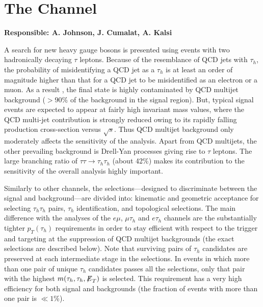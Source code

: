 \section{The \ditauhad Channel}\label{sec:dihad}
\textbf{Responsible: A. Johnson, J. Cumalat, A. Kalsi}


A search for new heavy gauge bosons is presented using events with two hadronically decaying $\tau$ leptons. Because of the resemblance of QCD jets with $\tau_{h}$, the probability of misidentifying a QCD jet as a $\tau_{h}$ is at least an order of magnitude higher than that for a QCD jet to be misidentified as an electron or a muon. As a result , the final state is highly contaminated by QCD multijet background ($> 90\%$ of the background in the signal region). But, typical signal events are expected to appear at fairly high invariant mass values, where the QCD multi-jet contribution is strongly reduced owing to its rapidly falling production cross-section versus $\sqrt{s}$. Thus QCD multijet background only moderately affects the sensitivity of the analysis. Apart from QCD multijets, the other prevailing background is Drell-Yan processes giving rise to $\tau$ leptons. The large branching ratio of $\tau\tau \to \tau_{h}\tau_{h}$ (about 42\%) makes its contribution to the sensitivity of the overall analysis highly important.   

Similarly to other channels, the selections---designed to discriminate between the signal and background---are divided into: kinematic and geometric acceptance for selecting $\tau_{h}\tau_{h}$ pairs, $\tau_{h}$ identification, and topological selections. The main difference with the analyses of the $e\mu$, $\mu \tau_h$ and $e \tau_h$ channels are the substantially tighter $p_{T}(\tau_{h})$ requirements in order to stay efficient with respect to the trigger and targeting at the suppression of QCD multijet backgrounds (the exact selections are described below). Note that surviving pairs of $\tau_{h}$ candidates are preserved at each intermediate stage in the selections. In events in which more than one pair of unique $\tau_{h}$ candidates passes all the selections, only that pair with the highest $m(\tau_{h},\tau_{h},{\not\mathrel{E}}_T)$ is selected. This requirement has a very high efficiency for both signal and backgrounds (the fraction of events with more than one pair is $\ll 1$\%).

